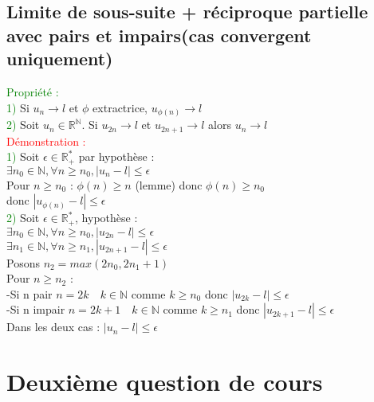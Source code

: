 \documentclass{article}
\begin{document}
\subsection{Limite de sous-suite + réciproque partielle avec pairs et impairs(cas convergent uniquement)}
\textcolor{green}{Propriété :} \\ 
\textcolor{green}{1)} Si $u_n \rightarrow l$ et $\phi$ extractrice, $u_{\phi(n)} \rightarrow l$ \\ 
\textcolor{green}{2)} Soit $u_n \in \mathbb{R}^{\mathbb{N}}$. Si $u_{2n} \rightarrow l$ et $u_{2n+
1} \rightarrow l$ alors $u_n \rightarrow l$ \\ 
\textcolor{red}{Démonstration :} \\ 
\textcolor{green}{1)} Soit $\epsilon \in \mathbb{R}^*_+$ par hypothèse : \\ 
$\exists n_0 \in \mathbb{N}, \forall n \geq n_0, |u_n-l| \leq \epsilon$ \\ 
Pour $n \geq n_0$ : $\phi(n)\geq n$ (lemme) donc $\phi(n)\geq n_0$ \\ 
donc $|u_{\phi(n)}-l|\leq \epsilon$ \\ 
\textcolor{green}{2)} Soit $\epsilon \in \mathbb{R}^*_+$, hypothèse : \\ 
$\exists n_0 \in \mathbb{N}, \forall n \geq n_0 , |u_{2n}-l| \leq \epsilon$ \\ 
$\exists n_1 \in \mathbb{N}, \forall n \geq n_1 , |u_{2n+1}-l| \leq \epsilon$ \\ 
Posons $n_2=max(2n_0,2n_1+1)$ \\ 
Pour $n \geq n_2$ : \\ 
-Si n pair $n=2k \quad k \in \mathbb{N}$  comme $k \geq n_0$ donc $|u_{2k}-l|\leq \epsilon$ \\ 
-Si n impair $n=2k+1 \quad k \in \mathbb{N}$  comme $k \geq n_1$ donc $|u_{2k+1}-l|\leq \epsilon$ \\ 
Dans les deux cas : $|u_n-l| \leq \epsilon $
\section{Deuxième question de cours }
\end{document}

